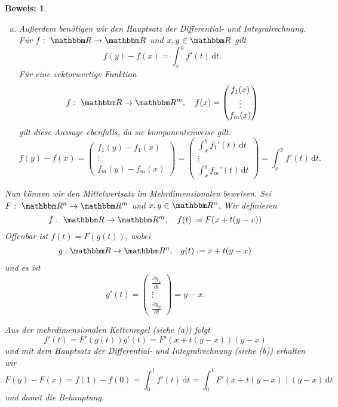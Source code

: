 \documentclass[12pt,a4paper]{book}
\theoremstyle{break}
\theoremstyle{nonumberplain}
\newtheorem{beweis}{Beweis:}
\newcommand{\R}{\mathbbm R}
\newcommand{\1}{\mathbbm{1}} 			      	%
\newcommand{\dx}[1][x]{\ensuremath{\, \mathrm{d} #1}} 	%
\begin{document}
\begin{appendix}
\begin{beweis}
\begin{enumerate}[(a)]
\item Außerdem benötigen wir den Hauptsatz der Differential- und Integralrechnung. Für
$f:\ \R\to \R$ und $x,y\in \R$ gilt
\[
f(y)-f(x)=\int_x^y f'(t)\dx[t].
\]
Für eine vektorwertige Funktion 
\[
f:\ \R\to \R^m,\quad f(x)=\begin{pmatrix}f_1(x)\\ \vdots \\ f_m(x)\end{pmatrix} 
\]
gilt diese Aussage ebenfalls, da sie komponentenweise gilt:
\[
f(y)-f(x)=\begin{pmatrix}f_1(y)-f_1(x)\\ \vdots \\ f_m(y)-f_m(x)\end{pmatrix} 
=\begin{pmatrix}\int_x^y f_1'(t)\dx[t]\\ \vdots \\ \int_x^y f_m'(t)\dx[t]\end{pmatrix} 
= \int_x^y f'(t)\dx[t].
\]
\end{enumerate}
Nun können wir den Mittelwertsatz im Mehrdimensionalen beweisen. 
Sei $F:\ \R^n\to \R^m$ und $x,y\in \R^n$. Wir definieren
\[
f:\ \R\to \R^m, \quad f(t):=F(x+t(y-x))
\]
Offenbar ist $f(t)=F(g(t))$, wobei
\begin{align*}
g: \R\to \R^n, & \quad g(t):=x+t(y-x)\\
\end{align*}
und es ist
\[
g'(t)=\begin{pmatrix} 
\frac{\partial g_1}{\partial t}\\ \vdots \\ \frac{\partial g_n}{\partial t}
\end{pmatrix}
= y-x.
\]

Aus der mehrdimensionalen Kettenregel (siehe (a)) folgt 
\[
f'(t)=F'(g(t))g'(t)=F'(x+t(y-x))(y-x)
\]
und mit dem Hauptsatz der Differential- und Integralrechnung (siehe (b)) erhalten wir
\[
F(y)-F(x)=f(1)-f(0)=\int_0^1 f'(t)\dx[t]=\int_0^1 F'(x+t(y-x))(y-x)\dx[t]
\]
und damit die Behauptung.
\end{beweis}




\end{appendix}
\end{document}
